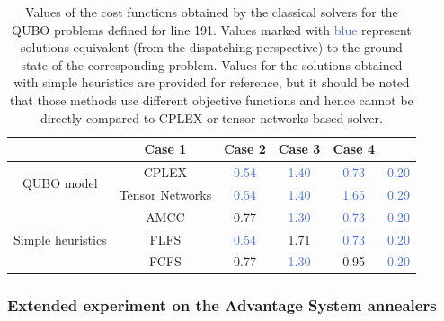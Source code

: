 \begin{table}
  \centering
  \begin{tabular}{|c|c|c|c|c|c|}
    \hline
    \rowcolor{theader} \multicolumn{2}{|c|}{Method} & Case 1          & Case 2                      & Case 3                      & Case 4                                                    \\
    \hline
    \multirow{2}{*}{QUBO model}                     & CPLEX           & \textcolor{RoyalBlue}{0.54} & \textcolor{RoyalBlue}{1.40} & \textcolor{RoyalBlue}{0.73} & \textcolor{RoyalBlue}{0.20} \\
    \cline{2-6}
                                                    & Tensor Networks & \textcolor{RoyalBlue}{0.54} & \textcolor{RoyalBlue}{1.40} & \textcolor{RoyalBlue}{1.65} & \textcolor{RoyalBlue}{0.29} \\
    \hline
    \multirow{3}{*}{Simple heuristics}              & AMCC            & 0.77                        & \textcolor{RoyalBlue}{1.30} & \textcolor{RoyalBlue}{0.73} & \textcolor{RoyalBlue}{0.20} \\
    \cline{2-6}
                                                    & FLFS            & \textcolor{RoyalBlue}{0.54} & 1.71                        & \textcolor{RoyalBlue}{0.73} & \textcolor{RoyalBlue}{0.20} \\
    \cline{2-6}
                                                    & FCFS            & 0.77                        & \textcolor{RoyalBlue}{1.30} & 0.95                        & \textcolor{RoyalBlue}{0.20} \\
    \hline
  \end{tabular}
  \caption{
    Values of the cost functions obtained by the classical solvers for the QUBO
    problems defined for line 191. Values marked with \textcolor{RoyalBlue}{blue}
    represent solutions equivalent (from the dispatching perspective) to the ground
    state of the corresponding problem. Values for the solutions obtained with
    simple heuristics are provided for reference, but it should be noted that those
    methods use different objective functions and hence cannot be directly compared
    to CPLEX or tensor networks-based solver. } \label{tab:line191classical}
\end{table}

\subsubsection{Extended experiment on the Advantage System annealers}

